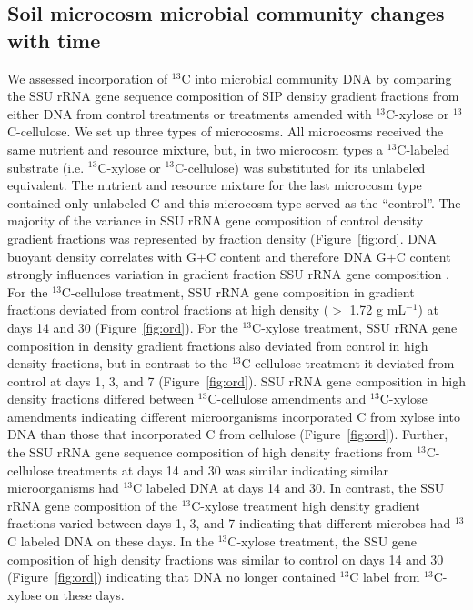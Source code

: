 \subsection{Soil microcosm microbial community changes with time}
We assessed incorporation of $^{13}$C into microbial community DNA by comparing the
SSU rRNA gene sequence composition of SIP density gradient fractions from
either DNA from control treatments or treatments amended with $^{13}$C-xylose
or $^{13}$C-cellulose. We set up three types of microcosms. All microcosms
received the same nutrient and resource mixture, but, in two microcosm types
a $^{13}$C-labeled substrate (i.e. $^{13}$C-xylose or $^{13}$C-cellulose) was
substituted for its unlabeled equivalent. The nutrient and resource mixture for
the last microcosm type contained only unlabeled C and this microcosm type
served as the ``control''. The majority of the variance in SSU rRNA gene
composition of control density gradient fractions was represented by fraction
density (Figure~\ref{fig:ord}. DNA buoyant density correlates with G$+$C
content \citep{Buckley_2007} and therefore DNA G$+$C content strongly
influences variation in gradient fraction SSU rRNA gene composition . For the
$^{13}$C-cellulose treatment, SSU rRNA gene composition in gradient fractions
deviated from control fractions at high density ($>$ 1.72 g mL$^{-1}$) at days
14 and 30 (Figure~\ref{fig:ord}). For the $^{13}$C-xylose treatment, SSU rRNA
gene composition in density gradient fractions also deviated from control in
high density fractions, but in contrast to the $^{13}$C-cellulose treatment it
deviated from control at days 1, 3, and 7 (Figure~\ref{fig:ord}). SSU rRNA gene
composition in high density fractions differed between $^{13}$C-cellulose
amendments and $^{13}$C-xylose amendments indicating different microorganisms
incorporated C from xylose into DNA than those that incorporated C from
cellulose (Figure~\ref{fig:ord}). Further, the SSU rRNA gene sequence
composition of high density fractions from $^{13}$C-cellulose treatments at
days 14 and 30 was similar indicating similar microorganisms had $^{13}$C
labeled DNA at days 14 and 30. In contrast, the SSU rRNA gene composition of
the $^{13}$C-xylose treatment high density gradient fractions varied between
days 1, 3, and 7 indicating that different microbes had $^{13}$C labeled DNA on
these days. In the $^{13}$C-xylose treatment, the SSU gene composition of high
density fractions was similar to control on days 14 and 30
(Figure~\ref{fig:ord}) indicating that DNA no longer contained $^{13}$C label
from $^{13}$C-xylose on these days. 

